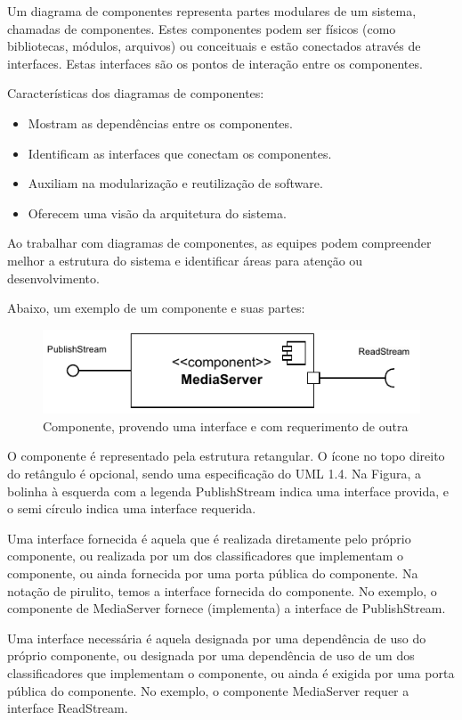 \documentclass[12pt, %
openright, 
oneside, %
a4paper,    %
brazil]{facom-ufu-abntex2}
\begin{document}
Um diagrama de componentes representa partes modulares de um sistema, chamadas
de componentes. Estes componentes podem ser físicos (como bibliotecas, módulos,
arquivos) ou conceituais e estão conectados através de interfaces. Estas
interfaces são os pontos de interação entre os componentes.

Características dos diagramas de componentes:
\begin{itemize}
	\item Mostram as dependências entre os componentes.
	\item Identificam as interfaces que conectam os componentes.
	\item Auxiliam na modularização e reutilização de software.
	\item Oferecem uma visão da arquitetura do sistema.
\end{itemize}

Ao trabalhar com diagramas de componentes, as equipes podem compreender melhor
a estrutura do sistema e identificar áreas para atenção ou desenvolvimento.

Abaixo, um exemplo de um componente e suas partes:

\begin{figure}[!ht]
	\centering
	\includegraphics[width=0.8\linewidth]{example_diagram.pdf}
	\caption[Componente de exemplo]{Componente, provendo uma interface e com requerimento de outra}
	\label{fig:graficosVariandoTamanhoRede}
\end{figure}

O componente é representado pela estrutura retangular. O ícone no topo direito
do retângulo é opcional, sendo uma especificação do UML 1.4. Na Figura, a
bolinha à esquerda com a legenda PublishStream indica uma interface provida, e
o semi círculo indica uma interface requerida.

Uma interface fornecida é aquela que é realizada diretamente pelo próprio
componente, ou realizada por um dos classificadores que implementam o
componente, ou ainda fornecida por uma porta pública do componente. Na notação
de pirulito, temos a interface fornecida do componente. No exemplo, o
componente de MediaServer fornece (implementa) a interface de PublishStream.

Uma interface necessária é aquela designada por uma dependência de uso do
próprio componente, ou designada por uma dependência de uso de um dos
classificadores que implementam o componente, ou ainda é exigida por uma porta
pública do componente. No exemplo, o componente MediaServer requer a interface
ReadStream.
\end{document}
